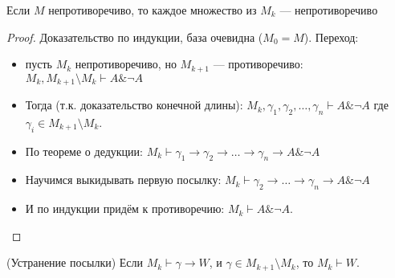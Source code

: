 \begin{lemma}
    Если $M$ непротиворечиво, то каждое множество из $M_k$ --- непротиворечиво
\end{lemma}
\begin{proof}Доказательство по индукции, база очевидна ($M_0 = M$).
Переход: \begin{itemize}
\item пусть $M_k$ непротиворечиво, но $M_{k+1}$ --- противоречиво: $M_k, M_{k+1}\setminus M_k \vdash A\&\neg A$
\item Тогда (т.к. доказательство конечной длины):
$M_k, \gamma_1, \gamma_2, \dots,\gamma_n\vdash A\&\neg A$
где $\gamma_i \in M_{k+1}\setminus M_k$.
\item По теореме о дедукции: $M_k\vdash \gamma_1\to\gamma_2\to\dots\to\gamma_n\to A\&\neg A$
\item Научимся выкидывать первую посылку: $M_k\vdash \gamma_2\to\dots\to\gamma_n\to A\&\neg A$
\item И по индукции придём к противоречию: $M_k \vdash A\&\neg A$.
\end{itemize}
\end{proof}

\begin{lemma}(Устранение посылки)
    Если $M_k\vdash\gamma\to W$, и $\gamma\in M_{k+1}\setminus M_k$, то $M_k\vdash W$.
\end{lemma}

